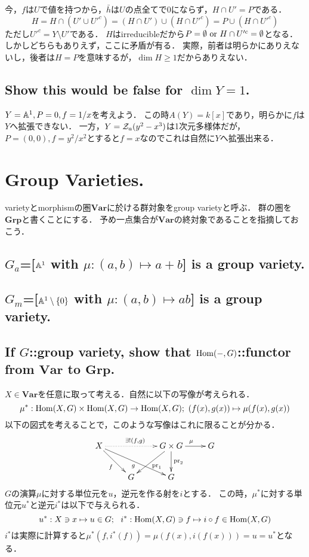 \documentclass[a4paper]{jsarticle}
\begin{document}
    今，$f$は$U$で値を持つから，$\bar{h}$は$U$の点全てで0にならず，$H \cap U'=P$である．
    \[ H=H \cap (U' \cup U'^c)=(H \cap U') \cup (H \cap U'^c)=P \cup (H \cap U'^c) \]
    ただし$U'^c=Y \setminus U'$である．
    $H$はirreducibleだから$P=\emptyset \text{ or } H \cap U'^c=\emptyset$となる．
    しかしどちらもありえず，ここに矛盾が有る．
    実際，前者は明らかにありえないし，後者は$H=P$を意味するが，$\dim H \geq 1$だからありえない．

    \subsection{Show this would be false for $\dim Y = 1$.}
    $Y=\mathbb{A}^1, P=0, f=1/x$を考えよう．
    この時$A(Y)=k[x]$であり，明らかに$f$は$Y$へ拡張できない．
    一方，$Y=\mathcal{Z}_a(y^2-x^3)$は1次元多様体だが，$P=(0,0), f=y^2/x^2$とすると$f=x$なのでこれは自然に$Y$へ拡張出来る．

\section{Group Varieties.}
    varietyとmorphismの圏$\mathbf{Var}$に於ける群対象をgroup varietyと呼ぶ．
    群の圏を$\mathbf{Grp}$と書くことにする．
    予め一点集合が$\mathbf{Var}$の終対象であることを指摘しておこう．

    \subsection{$G_a$=[$\mathbb{A}^1$ with $\mu:(a,b) \mapsto a+b$] is a group variety.}

    \subsection{$G_m$=[$\mathbb{A}^1 \setminus \{0\}$ with $\mu:(a,b) \mapsto ab$] is a group variety.}

    \subsection{If $G$::group variety, show that $\operatorname{Hom}(-,G)$::functor from $\mathbf{Var}$ to $\mathbf{Grp}$.}
    $X \in \mathbf{Var}$を任意に取って考える．自然に以下の写像が考えられる．
    \[ \mu^{\ast}: \operatorname{Hom}(X,G) \times \operatorname{Hom}(X,G) \to \operatorname{Hom}(X,G);~ (f(x),g(x)) \mapsto \mu(f(x),g(x)) \]
    以下の図式を考えることで，このような写像はこれに限ることが分かる．
    \[
    \xymatrix
    {
    X \ar[dr]_{f} \ar[drr]_{g} \ar@{..>}[rr]^{\exists! (f,g)}
        & {}
        & G \times G \ar[dl]^{\pr_1} \ar[d]^{\pr_2} \ar[r]^{\mu}& G \\
    {} & G & G
    }
    \]
    $G$の演算$\mu$に対する単位元を$u$，逆元を作る射を$i$とする．
    この時，$\mu^{\ast}$に対する単位元$u^{\ast}$と逆元$i^{\ast}$は以下で与えられる．
    \[u^{\ast}: X \ni x \mapsto u \in G;~~ i^{\ast}: \operatorname{Hom}(X,G) \ni f \mapsto i \circ f \in \operatorname{Hom}(X,G)\]
    $i^{\ast}$は実際に計算すると$\mu^{\ast}(f, i^{\ast}(f))=\mu(f(x), i(f(x)))=u=u^{\ast}$となる．
\end{document}
